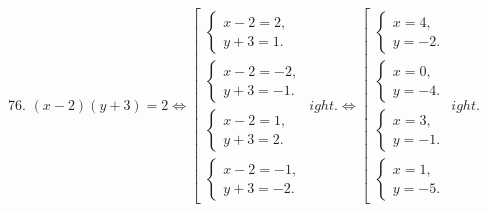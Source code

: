76. $(x-2)(y+3)=2\Leftrightarrow \left[\begin{array}{l}\begin{cases}x-2=2,\\ y+3=1.\end{cases}\\ \begin{cases}x-2=-2,\\ y+3=-1.\end{cases}\\
\begin{cases}x-2=1,\\ y+3=2.\end{cases}\\ \begin{cases}x-2=-1,\\ y+3=-2.\end{cases}\end{array}
ight.\Leftrightarrow
\left[\begin{array}{l}\begin{cases}x=4,\\ y=-2.\end{cases}\\ \begin{cases} x=0,\\ y=-4.\end{cases}\\
\begin{cases}x=3,\\ y=-1.\end{cases}\\ \begin{cases}x=1,\\ y=-5.\end{cases}\end{array}
ight.$\\
